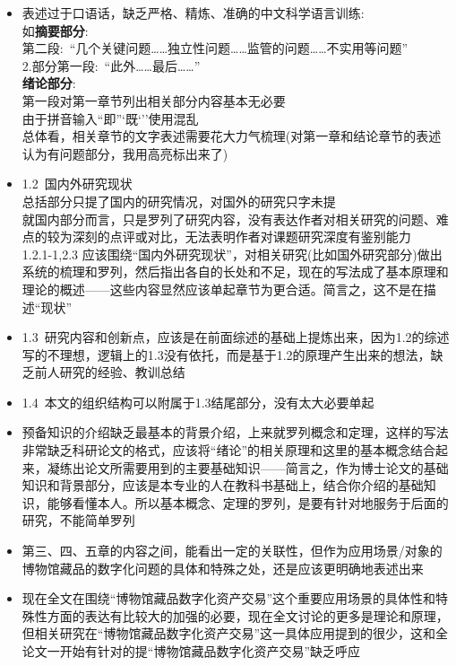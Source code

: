 \begin{itemize}
	\item 表述过于口语话，缺乏严格、精炼、准确的中文科学语言训练:\\
		如\textbf{摘要部分}:\\
		第二段:~``几个关键问题……独立性问题……监管的问题……不实用等问题''\\
		2.部分第一段:~``此外……最后……''\\
		\textbf{绪论部分}:\\
		第一段对第一章节列出相关部分内容基本无必要\\
		由于拼音输入``即''`既`''使用混乱\\

		总体看，相关章节的文字表述需要花大力气梳理(对第一章和结论章节的表述认为有问题部分，我用高亮标出来了)
	\item 1.2~国内外研究现状\\
		总括部分只提了国内的研究情况，对国外的研究只字未提\\
		就国内部分而言，只是罗列了研究内容，没有表达作者对相关研究的问题、难点的较为深刻的点评或对比，无法表明作者对课题研究深度有鉴别能力\\
		1.2.1-1,2.3 应该围绕``国内外研究现状''，对相关研究(比如国外研究部分)做出系统的梳理和罗列，然后指出各自的长处和不足，现在的写法成了基本原理和理论的概述——这些内容显然应该单起章节为更合适。简言之，这不是在描述``现状''
	\item 1.3~研究内容和创新点，应该是在前面综述的基础上提炼出来，因为1.2的综述写的不理想，逻辑上的1.3没有依托，而是基于1.2的原理产生出来的想法，缺乏前人研究的经验、教训总结
	\item 1.4~本文的组织结构可以附属于1.3结尾部分，没有太大必要单起
	\item 预备知识的介绍缺乏最基本的背景介绍，上来就罗列概念和定理，这样的写法非常缺乏科研论文的格式，应该将``绪论''的相关原理和这里的基本概念结合起来，凝练出论文所需要用到的主要基础知识——简言之，作为博士论文的基础知识和背景部分，应该是本专业的人在教科书基础上，结合你介绍的基础知识，能够看懂本人。所以基本概念、定理的罗列，是要有针对地服务于后面的研究，不能简单罗列
	\item 第三、四、五章的内容之间，能看出一定的关联性，但作为应用场景/对象的博物馆藏品的数字化问题的具体和特殊之处，还是应该更明确地表述出来\\
	\item 现在全文在围绕``博物馆藏品数字化资产交易''这个重要应用场景的具体性和特殊性方面的表达有比较大的加强的必要，现在全文讨论的更多是理论和原理，但相关研究在``博物馆藏品数字化资产交易''这一具体应用提到的很少，这和全论文一开始有针对的提``博物馆藏品数字化资产交易''缺乏呼应
\end{itemize}
